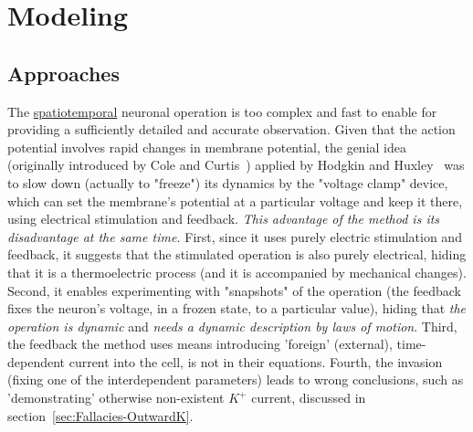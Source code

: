 
\section[Modeling]{Modeling\label{sec:SingleModeling}}




\subsection{Approaches\label{sec:Single-ModelingApproaches}}
The \hyperlink{spatiotemporal}{spatiotemporal} neuronal operation is too complex and fast to enable for providing a
sufficiently detailed and accurate observation. 
Given that the action potential involves rapid changes in membrane potential,
the genial idea (originally introduced by Cole and Curtis~\cite{COLE_CURTIS_IMPEDANCE:1939}) applied by Hodgkin and Huxley~\cite{HodgkinHuxley:1952} was to slow down (actually to "freeze") 
its dynamics by the "voltage clamp" device, which can set the membrane's potential
at a particular voltage and keep it there, using electrical stimulation and feedback.
\textit{This advantage of the method is its disadvantage at the same time.} 
First, since it uses purely electric stimulation and feedback, it suggests 
that the stimulated operation is also purely electrical,
hiding that it is a thermoelectric process (and it is accompanied by mechanical changes). Second, it enables experimenting
with "snapshots" of the operation (the feedback fixes the neuron's voltage, in a frozen state, to a particular value), hiding that \textit{the operation is dynamic} and
\textit{needs a dynamic description by laws of motion}.
Third, the feedback the method uses means introducing
'foreign' (external), time-dependent current into the cell, is not in their equations. Fourth, the invasion (fixing
one of the interdependent parameters) leads to wrong conclusions, such as 'demonstrating' otherwise non-existent $K^+$ current, discussed in section~\ref{sec:Fallacies-OutwardK}.

